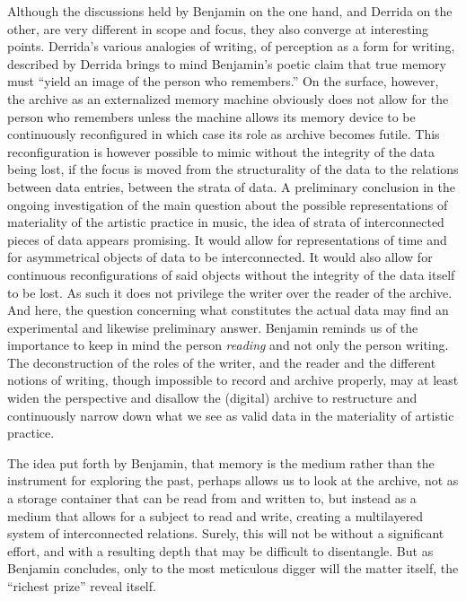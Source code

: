 \documentclass[11pt,a4paper]{article}
\begin{document}
Although the discussions held by Benjamin on the one hand, and Derrida on the other, are very different in scope and focus, they also converge at interesting points. Derrida's various analogies of writing, of perception as a form for writing, described by Derrida brings to mind Benjamin's poetic claim that true memory must ``yield an image of the person who remembers.'' \citep[p. 576]{benjamin2005} On the surface, however, the archive as an externalized memory machine obviously does not allow for the person who remembers unless the machine allows its memory device to be continuously reconfigured in which case its role as archive becomes futile. This reconfiguration is however possible to mimic without the integrity of the data being lost, if the focus is moved from the structurality of the data to the relations between data entries, between the strata of data. A preliminary conclusion in the ongoing investigation of the main question about the possible representations of materiality of the artistic practice in music, the idea of strata of interconnected pieces of data appears promising. It would allow for representations of time and for asymmetrical objects of data to be interconnected. It would also allow for continuous reconfigurations of said objects without the integrity of the data itself to be lost. As such it does not privilege the writer over the reader of the archive. And here, the question concerning what constitutes the actual data may find an experimental and likewise preliminary answer. Benjamin reminds us of the importance to keep in mind the person \emph{reading} and not only the person writing. The deconstruction of the roles of the writer, and the reader and the different notions of writing, though impossible to record and archive properly, may at least widen the perspective and disallow the (digital) archive to restructure and continuously narrow down what we see as valid data in the materiality of artistic practice.

The idea put forth by Benjamin, that memory is the medium rather than the instrument for exploring the past, perhaps allows us to look at the archive, not as a storage container that can be read from and written to, but instead as a medium that allows for a subject to read and write, creating a multilayered system of interconnected relations. Surely, this will not be without a significant effort, and with a resulting depth that may be difficult to disentangle. But as Benjamin concludes, only to the most meticulous digger will the matter itself, the ``richest prize'' \citep[p. 576]{benjamin2005} reveal itself.


\printbibliography
\end{document}
